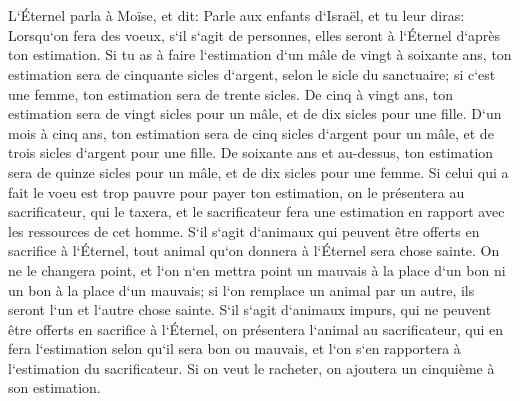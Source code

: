 \chapter{}

\verse L`Éternel parla à Moïse, et dit: 
\verse Parle aux enfants d`Israël, et tu leur diras: Lorsqu`on fera des voeux, s`il s`agit de personnes, elles seront à l`Éternel d`après ton estimation. 
\verse Si tu as à faire l`estimation d`un mâle de vingt à soixante ans, ton estimation sera de cinquante sicles d`argent, selon le sicle du sanctuaire; 
\verse si c`est une femme, ton estimation sera de trente sicles. 
\verse De cinq à vingt ans, ton estimation sera de vingt sicles pour un mâle, et de dix sicles pour une fille. 
\verse D`un mois à cinq ans, ton estimation sera de cinq sicles d`argent pour un mâle, et de trois sicles d`argent pour une fille. 
\verse De soixante ans et au-dessus, ton estimation sera de quinze sicles pour un mâle, et de dix sicles pour une femme. 
\verse Si celui qui a fait le voeu est trop pauvre pour payer ton estimation, on le présentera au sacrificateur, qui le taxera, et le sacrificateur fera une estimation en rapport avec les ressources de cet homme. 
\verse S`il s`agit d`animaux qui peuvent être offerts en sacrifice à l`Éternel, tout animal qu`on donnera à l`Éternel sera chose sainte. 
\verse On ne le changera point, et l`on n`en mettra point un mauvais à la place d`un bon ni un bon à la place d`un mauvais; si l`on remplace un animal par un autre, ils seront l`un et l`autre chose sainte. 
\verse S`il s`agit d`animaux impurs, qui ne peuvent être offerts en sacrifice à l`Éternel, on présentera l`animal au sacrificateur, 
\verse qui en fera l`estimation selon qu`il sera bon ou mauvais, et l`on s`en rapportera à l`estimation du sacrificateur. 
\verse Si on veut le racheter, on ajoutera un cinquième à son estimation. 

